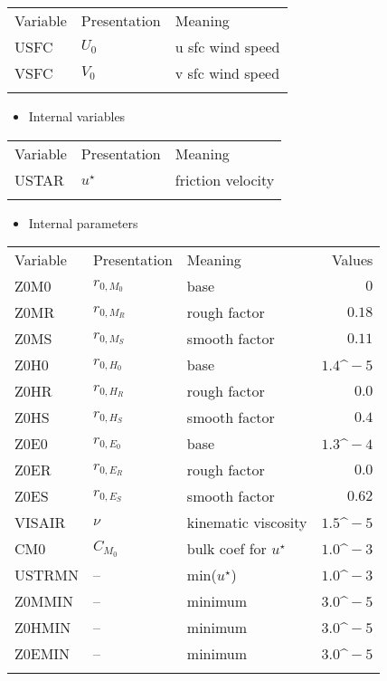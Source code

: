 \setlength\LTleft{0pt}\setlength\LTright{0pt}\begin{longtable}[]{@{}lll@{}}
\toprule\relax
Variable & Presentation & Meaning \\ \addlinespace
\midrule\relax
\endhead
USFC & \(U_0\) & u sfc wind speed \\ \addlinespace
VSFC & \(V_0\) & v sfc wind speed \\ \addlinespace
\bottomrule
\end{longtable}

\begin{itemize}
\tightlist
\item
  Internal variables
\end{itemize}

\setlength\LTleft{0pt}\setlength\LTright{0pt}\begin{longtable}[]{@{}lll@{}}
\toprule\relax
Variable & Presentation & Meaning \\ \addlinespace
\midrule\relax
\endhead
USTAR & \(u^\star\) & friction velocity \\ \addlinespace
\bottomrule
\end{longtable}

\begin{itemize}
\tightlist
\item
  Internal parameters
\end{itemize}

\setlength\LTleft{0pt}\setlength\LTright{0pt}\begin{longtable}[]{@{}lllr@{}}
\toprule\relax
Variable & Presentation & Meaning & Values \\ \addlinespace
\midrule\relax
\endhead
Z0M0 & \(r_{0,M_0}\) & base & \(0\) \\ \addlinespace
Z0MR & \(r_{0,M_R}\) & rough factor & $ 0.18 $ \\ \addlinespace
Z0MS & \(r_{0,M_S}\) & smooth factor & $ 0.11 $ \\ \addlinespace
Z0H0 & \(r_{0,H_0}\) & base & $ 1.4\^{}-5 $ \\ \addlinespace
Z0HR & \(r_{0,H_R}\) & rough factor & $ 0.0 $ \\ \addlinespace
Z0HS & \(r_{0,H_S}\) & smooth factor & $ 0.4 $ \\ \addlinespace
Z0E0 & \(r_{0,E_0}\) & base & $ 1.3\^{}-4 $ \\ \addlinespace
Z0ER & \(r_{0,E_R}\) & rough factor & $ 0.0 $ \\ \addlinespace
Z0ES & \(r_{0,E_S}\) & smooth factor & $ 0.62 $ \\ \addlinespace
VISAIR & \(\nu\) & kinematic viscosity & $ 1.5\^{}-5
$ \\ \addlinespace
CM0 & \(C_{M_0}\) & bulk coef for \(u^\star\) & $ 1.0\^{}-3
$ \\ \addlinespace
USTRMN & -- & min(\(u^\star\)) & $ 1.0\^{}-3 $ \\ \addlinespace
Z0MMIN & -- & minimum & $ 3.0\^{}-5 $ \\ \addlinespace
Z0HMIN & -- & minimum & $ 3.0\^{}-5 $ \\ \addlinespace
Z0EMIN & -- & minimum & $ 3.0\^{}-5 $ \\ \addlinespace
\bottomrule
\end{longtable}

